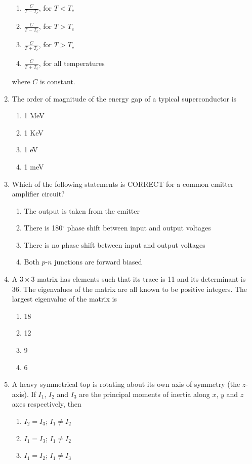 \documentclass[journal]{IEEEtran}
\begin{document}
\begin{enumerate}
\begin{enumerate}
    \item $\frac{C}{T-T_c}$, for $T < T_c$
    \item $\frac{C}{T-T_c}$, for $T > T_c$
    \item $\frac{C}{T+T_c}$, for $T > T_c$
    \item $\frac{C}{T+T_c}$, for all temperatures
\end{enumerate}
where $C$ is constant.
\item The order of magnitude of the energy gap of a typical superconductor is
\begin{enumerate}
    \item 1 MeV
    \item 1 KeV
    \item 1 eV
    \item 1 meV
\end{enumerate}
\item Which of the following statements is CORRECT for a common emitter amplifier circuit?
\begin{enumerate}
    \item The output is taken from the emitter
    \item There is 180$^\circ$ phase shift between input and output voltages
    \item There is no phase shift between input and output voltages
    \item Both $p$-$n$ junctions are forward biased
\end{enumerate}
\item A $3\times3$ matrix has elements such that its trace is 11 and its determinant is 36. The eigenvalues of the matrix are all known to be positive integers. The largest eigenvalue of the matrix is
\begin{enumerate}
    \item 18
    \item 12
    \item 9
    \item 6
\end{enumerate}
\item A heavy symmetrical top is rotating about its own axis of symmetry (the $z$-axis). If $I_1$, $I_2$ and $I_3$ are the
principal moments of inertia along $x$, $y$ and $z$ axes respectively, then
\begin{enumerate}
    \item $I_2 = I_3$; $I_1 \neq I_2$
    \item $I_1 = I_3$; $I_1 \neq I_2$
    \item $I_1 = I_2$; $I_1 \neq I_3$

\end{enumerate}
\end{enumerate}
\end{document}

